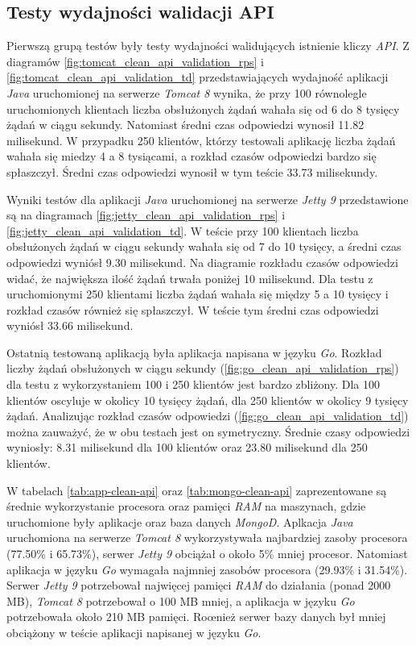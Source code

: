 \subsection{Testy wydajności walidacji API}
Pierwszą grupą testów były testy wydajności walidujących istnienie kliczy \textsl{API}. Z diagramów \ref{fig:tomcat_clean_api_validation_rps} i \ref{fig:tomcat_clean_api_validation_td} przedstawiających wydajność aplikacji \textsl{Java} uruchomionej na serwerze \textsl{Tomcat 8} wynika, że przy 100 równolegle uruchomionych klientach liczba obsłużonych żądań wahała się od 6 do 8 tysięcy żądań w ciągu sekundy. Natomiast średni czas odpowiedzi wynosił 11.82 milisekund. W przypadku 250 klientów, którzy testowali aplikację liczba żądań wahała się miedzy 4 a 8 tysiącami, a rozkład czasów odpowiedzi bardzo się spłaszczył. Średni czas odpowiedzi wynosił w tym teście 33.73 milisekundy.

Wyniki testów dla aplikacji \textsl{Java} uruchomionej na serwerze \textsl{Jetty 9} przedstawione są na diagramach \ref{fig:jetty_clean_api_validation_rps} i \ref{fig:jetty_clean_api_validation_td}. W teście przy 100 klientach liczba obsłużonych żądań w ciągu sekundy wahała się od 7 do 10 tysięcy, a średni czas odpowiedzi wyniósł 9.30 milisekund. Na diagramie rozkładu czasów odpowiedzi widać, że największa ilość żądań trwała poniżej 10 milisekund. Dla testu z uruchomionymi 250 klientami liczba żądań wahała się między 5 a 10 tysięcy i rozkład czasów również się spłaszczył. W teście tym średni czas odpowiedzi wyniósł 33.66 milisekund. 

Ostatnią testowaną aplikacją była aplikacja napisana w języku \textsl{Go}. Rozkład liczby żądań obsłużonych w ciągu sekundy (\ref{fig:go_clean_api_validation_rps}) dla testu z wykorzystaniem 100 i 250 klientów jest bardzo zbliżony. Dla 100 klientów oscyluje w okolicy 10 tysięcy żądań, dla 250 klientów w okolicy 9 tysięcy żądań. Analizując rozkład czasów odpowiedzi (\ref{fig:go_clean_api_validation_td}) można zauważyć, że w obu testach jest on symetryczny. Średnie czasy odpowiedzi wyniosły: 8.31 milisekund dla 100 klientów oraz 23.80 milisekund dla 250 klientów.

W tabelach \ref{tab:app-clean-api} oraz \ref{tab:mongo-clean-api} zaprezentowane są średnie wykorzystanie procesora oraz pamięci \textsl{RAM} na maszynach, gdzie uruchomione były aplikacje oraz baza danych \textsl{MongoD}. Aplkacja \textsl{Java} uruchomiona na serwerze \textsl{Tomcat 8} wykorzystywała najbardziej zasoby procesora (77.50\% i 65.73\%), serwer \textsl{Jetty 9} obciążał o około 5\% mniej procesor. Natomiast aplikacja w języku \textsl{Go} wymagała najmniej zasobów procesora (29.93\% i 31.54\%). Serwer \textsl{Jetty 9} potrzebował najwięcej pamięci \textsl{RAM} do działania (ponad 2000 MB), \textsl{Tomcat 8} potrzebował o 100 MB mniej, a aplikacja w języku \textsl{Go} potrzebowała około 210 MB pamięci. Roœnież serwer bazy danych był mniej obciążony w teście aplikacji napisanej w języku \textsl{Go}.

